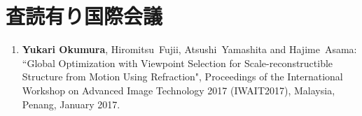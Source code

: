 \section*{査読有り国際会議}
\mbox{}

\begin{enumerate}

\item
\textbf{Yukari Okumura}, Hiromitsu~Fujii, Atsushi~Yamashita and Hajime~Asama: ``Global Optimization with Viewpoint Selection for Scale-reconstructible Structure from Motion Using Refraction", Proceedings of the International Workshop on Advanced Image Technology 2017 (IWAIT2017), Malaysia, Penang, January 2017. 

\end{enumerate}


%
%


%
%
%
%
%
%


